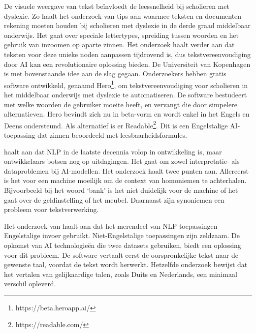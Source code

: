 
De visuele weergave van tekst beïnvloedt de leessnelheid bij scholieren met dyslexie. Zo haalt het onderzoek van \textcite{Rello2012} tips aan waarmee teksten en documenten rekening moeten houden bij scholieren met dyslexie in de derde graad middelbaar onderwijs. Het gaat over speciale lettertypes, spreiding tussen woorden en het gebruik van inzoomen op aparte zinnen. Het onderzoek haalt verder aan dat teksten voor deze unieke noden aanpassen tijdrovend is, dus tekstvereenvoudiging door AI kan een revolutionaire oplossing bieden. De Universiteit van Kopenhagen is met bovenstaande idee aan de slag gegaan. Onderzoekers \textcite{Bingel2018} hebben gratis software ontwikkeld, genaamd Hero\footnote{https://beta.heroapp.ai/}, om tekstvereenvoudiging voor scholieren in het middelbaar onderwijs met dyslexie te automatiseren. De software bestudeert met welke woorden de gebruiker moeite heeft, en vervangt die door simpelere alternatieven. Hero bevindt zich nu in beta-vorm en wordt enkel in het Engels en Deens ondersteund. Als alternatief is er Readable\footnote{https://readable.com/}. Dit is een Engelstalige AI-toepassing dat zinnen beoordeeld met leesbaarheidsformules.

\textcite{Roldos2020} haalt aan dat NLP in de laatste decennia volop in ontwikkeling is, maar ontwikkelaars botsen nog op uitdagingen. Het gaat om zowel interpretatie- als dataproblemen bij AI-modellen. Het onderzoek haalt twee punten aan. Allereerst is het voor een machine moeilijk om de context van homoniemen te achterhalen. Bijvoorbeeld bij het woord ‘bank’ is het niet duidelijk voor de machine of het gaat over de geldinstelling of het meubel. Daarnaast zijn synoniemen een probleem voor tekstverwerking.

Het onderzoek van \textcite{Sciforce2020} haalt aan dat het merendeel van NLP-toepassingen Engelstalige invoer gebruikt. Niet-Engelstalige toepassingen zijn zeldzaam. De opkomst van AI technologieën die twee datasets gebruiken, biedt een oplossing voor dit probleem. De software vertaalt eerst de oorspronkelijke tekst naar de gewenste taal, voordat de tekst wordt herwerkt. Hetzelfde onderzoek bewijst dat het vertalen van gelijkaardige talen, zoals Duits en Nederlands, een minimaal verschil opleverd.

